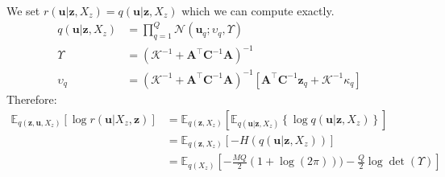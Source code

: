 \documentclass[12pt]{article}
\newcommand{\Kappa}{\mathcal{K}}
\newcommand{\ub}{\mathbf{u}}
\newcommand{\zb}{\mathbf{z}}
\newcommand{\Cb}{\mathbf{C}}
\newcommand{\Ab}{\mathbf{A}}
\newcommand{\Kzz}{\mathbf{K}_{zz}}
\newcommand{\Kuu}{\mathbf{K}_{uu}}
\newcommand{\Kuz}{\mathbf{K}_{uz}}
\newcommand{\Kzu}{\mathbf{K}_{zu}}
\newcommand{\Ex}{\mathbb{E}}
\begin{document}
%
We set $r(\ub|\zb,X_z) = q(\ub|\zb,X_z)$ which we can compute exactly.
%
\begin{align}
q(\ub|\zb,X_z) &= \prod_{q=1}^Q \mathcal{N}(\ub_q; \upsilon_q, \Upsilon) \\
\Upsilon &= (\Kappa^{-1} + \Ab^\top\Cb^{-1}\Ab)^{-1} \\
\upsilon_q &= (\Kappa^{-1} + \Ab^\top\Cb^{-1}\Ab)^{-1}[\Ab^\top \Cb^{-1}\zb_q + \Kappa^{-1}\kappa_q]
\end{align}
%
Therefore:
%
\begin{align}
\Ex_{q(\zb,\ub,X_z)}\left[\log r(\ub|X_z,\zb)\right] &= \Ex_{q(\zb,X_z)}\left[ \Ex_{q(\ub|\zb,X_z)} \left\{\log q(\ub|\zb,X_z) \right\} \right] \\
&= \Ex_{q(\zb,X_z)}\left[-H(q(\ub|\zb,X_z)) \right] \\
&= \Ex_{q(X_z)}\left[-\frac{MQ}{2}(1+\log(2\pi))) -\frac{Q}{2}\log\det(\Upsilon) \right]
\end{align}
%
\end{document}
